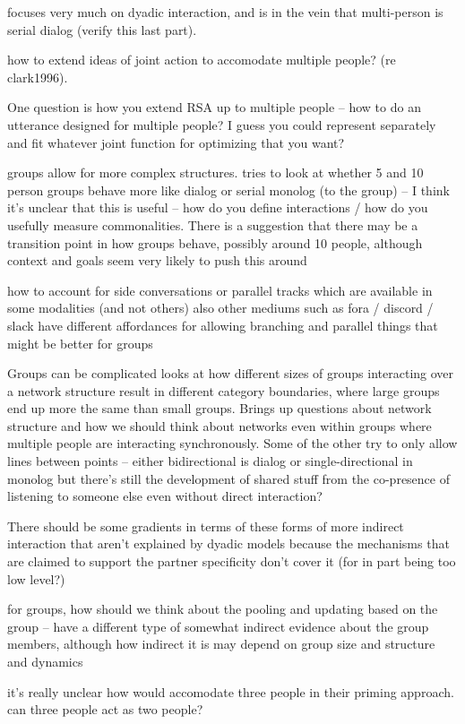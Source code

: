 \documentclass[]{article}
\begin{document}
\cite{clark1996} focuses very much on dyadic interaction, and is in the vein that multi-person is serial dialog (verify this last part). 

how to extend ideas of joint action to accomodate multiple people? (re clark1996). 

One question is how you extend RSA up to multiple people -- how to do an utterance designed for multiple people? I guess you could represent separately and fit whatever joint function for optimizing that you want? 

groups allow for more complex structures. \cite{fay2000} tries to look at whether 5 and 10 person groups behave more like dialog or serial monolog (to the group) -- I think it's unclear that this is useful -- how do you define interactions / how do you usefully measure commonalities. There is a suggestion that there may be a transition point in how groups behave, possibly around 10 people, although context and goals seem very likely to push this around 

how to account for side conversations or parallel tracks which are available in some modalities (and not others) also other mediums such as fora / discord / slack have different affordances for allowing branching and parallel things that might be better for groups 

Groups can be complicated \cite{guilbeault2021} looks at how different sizes of groups interacting over a network structure result in different category boundaries, where large groups end up more the same than small groups. Brings up questions about network structure and how we should think about networks even within groups where multiple people are interacting synchronously. Some of the other try to only allow lines between points -- either bidirectional is dialog or single-directional in monolog but there's still the development of shared stuff from the co-presence of listening to someone else even without direct interaction? 

There should be some gradients in terms of these forms of more indirect interaction that aren't explained by dyadic models because the mechanisms that are claimed to support the partner specificity don't cover it (for in part being too low level?)

\cite{hawkins2021} for groups, how should we think about the pooling and updating based on the group -- have a different type of somewhat indirect evidence about the group members, although how indirect it is may depend on group size and structure and dynamics 

it's really unclear how \cite{pickering2004} would accomodate three people in their priming approach. can three people act as two people? 



\end{document}
